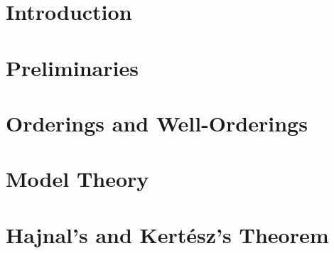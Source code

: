 \documentclass[a4paper,12pt]{memoir}
\numberwithin{equation}{section} %
\theoremstyle{plain} %
\theoremstyle{definition} %
\theoremstyle{remark} %
\begin{document}
\tableofcontents*



\chapter*{Introduction}




\mainmatter %

\chapter{Preliminaries}\label{preliminaries}


\chapter{Orderings and Well-Orderings}\label{orderings}


\chapter{Model Theory}\label{model-theory}


\chapter{Hajnal's and Kertész's Theorem}




\appendix %


\backmatter


%
%
\printbibliography

\end{document}
